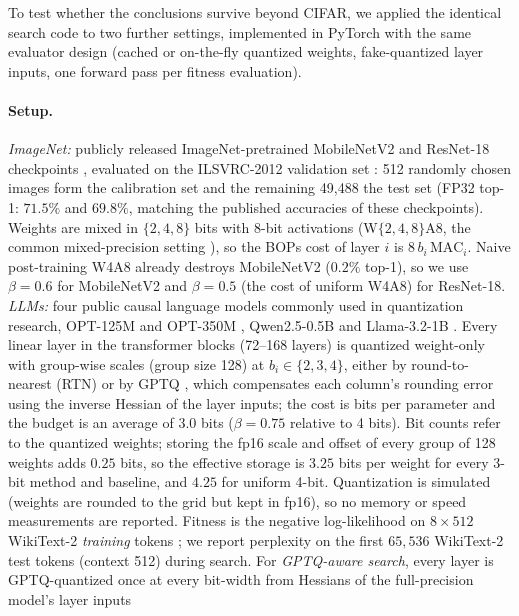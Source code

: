 \documentclass[11pt,a4paper]{article}
\begin{document}
To test whether the conclusions survive beyond CIFAR, we applied the identical search code to two
further settings, implemented in PyTorch with the same evaluator design (cached or on-the-fly
quantized weights, fake-quantized layer inputs, one forward pass per fitness evaluation).

\paragraph{Setup.} \emph{ImageNet:} publicly released ImageNet-pretrained MobileNetV2 and ResNet-18
checkpoints \citep{Sandler2018,He2016}, evaluated on the ILSVRC-2012 validation set
\citep{Russakovsky2015ImageNet}: 512 randomly chosen images form the calibration set and the remaining
49{,}488 the test set (FP32 top-1: $71.5\%$ and $69.8\%$, matching the published accuracies of these
checkpoints). Weights are mixed in $\{2,4,8\}$ bits with 8-bit activations
(W$\{2,4,8\}$A8, the common mixed-precision setting \citep{Yao2021HAWQV3}), so the BOPs cost of layer
$i$ is $8\,b_i\,\mathrm{MAC}_i$. Naive post-training W4A8 already destroys MobileNetV2 ($0.2\%$
top-1), so we use $\beta=0.6$ for MobileNetV2 and $\beta=0.5$ (the cost of uniform W4A8) for
ResNet-18. \emph{LLMs:} four public causal language models commonly used in quantization research,
OPT-125M and OPT-350M \citep{Zhang2022OPT}, Qwen2.5-0.5B \citep{Qwen2024} and Llama-3.2-1B
\citep{Grattafiori2024Llama3}. Every linear layer in the transformer blocks (72--168 layers) is quantized
weight-only with group-wise scales (group size 128) at $b_i\in\{2,3,4\}$, either by round-to-nearest
(RTN) or by GPTQ \citep{Frantar2023GPTQ}, which compensates each column's rounding error using the
inverse Hessian of the layer inputs; the cost is bits per parameter and the budget is an average
of $3.0$ bits ($\beta=0.75$ relative to 4 bits). Bit counts refer to the quantized weights; storing the
fp16 scale and offset of every group of 128 weights adds $0.25$ bits, so the effective storage is $3.25$
bits per weight for every 3-bit method and baseline, and $4.25$ for uniform 4-bit. Quantization is simulated
(weights are rounded to the grid but kept in fp16), so no memory or speed measurements are reported. Fitness is the negative log-likelihood on
$8\times512$ WikiText-2 \emph{training} tokens \citep{Merity2017WikiText}; we report perplexity on the
first $65{,}536$ WikiText-2 test tokens (context 512) during search. For \emph{GPTQ-aware search}, every
layer is GPTQ-quantized once at every bit-width from Hessians of the full-precision model's layer inputs
\end{document}
